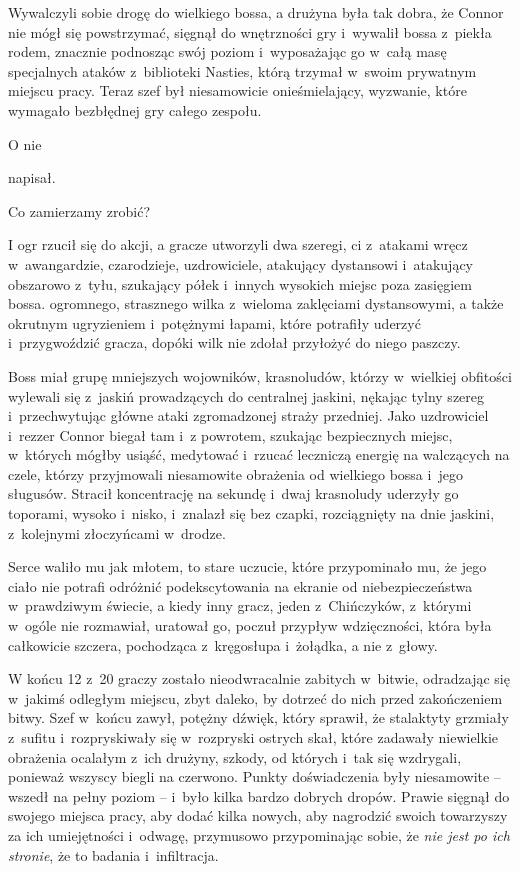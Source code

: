 \documentclass[oneside,polish,11pt,rmheadings]{mwbk}
\begin{document}
Wywalczyli sobie drogę do wielkiego bossa, a drużyna była tak dobra, że Connor nie mógł się powstrzymać, sięgnął do wnętrzności gry i~wywalił bossa z~piekła rodem, znacznie podnosząc swój poziom i~wyposażając go w~całą masę specjalnych ataków z~biblioteki Nasties, którą trzymał w~swoim prywatnym miejscu pracy. Teraz szef był niesamowicie onieśmielający, wyzwanie, które wymagało bezbłędnej gry całego zespołu.

\noindent {\textgreater} O nie

napisał.

\noindent {\textgreater} Co zamierzamy zrobić?

I ogr rzucił się do akcji, a gracze utworzyli dwa szeregi, ci z~atakami wręcz w~awangardzie, czarodzieje, uzdrowiciele, atakujący dystansowi i~atakujący obszarowo z~tyłu, szukający półek i~innych wysokich miejsc poza zasięgiem bossa. ogromnego, strasznego wilka z~wieloma zaklęciami dystansowymi, a także okrutnym ugryzieniem i~potężnymi łapami, które potrafiły uderzyć i~przygwoździć gracza, dopóki wilk nie zdołał przyłożyć do niego paszczy.

Boss miał grupę mniejszych wojowników, krasnoludów, którzy w~wielkiej obfitości wylewali się z~jaskiń prowadzących do centralnej jaskini, nękając tylny szereg i~przechwytując główne ataki zgromadzonej straży przedniej. Jako uzdrowiciel i~rezzer Connor biegał tam i~z powrotem, szukając bezpiecznych miejsc, w~których mógłby usiąść, medytować i~rzucać leczniczą energię na walczących na czele, którzy przyjmowali niesamowite obrażenia od wielkiego bossa i~jego sługusów. Stracił koncentrację na sekundę i~dwaj krasnoludy uderzyły go toporami, wysoko i~nisko, i~znalazł się bez czapki, rozciągnięty na dnie jaskini, z~kolejnymi złoczyńcami w~drodze.

Serce waliło mu jak młotem, to stare uczucie, które przypominało mu, że jego ciało nie potrafi odróżnić podekscytowania na ekranie od niebezpieczeństwa w~prawdziwym świecie, a kiedy inny gracz, jeden z~Chińczyków, z~którymi w~ogóle nie rozmawiał, uratował go, poczuł przypływ wdzięczności, która była całkowicie szczera, pochodząca z~kręgosłupa i~żołądka, a nie z~głowy.

W końcu 12 z~20 graczy zostało nieodwracalnie zabitych w~bitwie, odradzając się w~jakimś odległym miejscu, zbyt daleko, by dotrzeć do nich przed zakończeniem bitwy. Szef w~końcu zawył, potężny dźwięk, który sprawił, że stalaktyty grzmiały z~sufitu i~rozpryskiwały się w~rozpryski ostrych skał, które zadawały niewielkie obrażenia ocalałym z~ich drużyny, szkody, od których i~tak się wzdrygali, ponieważ wszyscy biegli na czerwono. Punkty doświadczenia były niesamowite -- wszedł na pełny poziom -- i~było kilka bardzo dobrych dropów. Prawie sięgnął do swojego miejsca pracy, aby dodać kilka nowych, aby nagrodzić swoich towarzyszy za ich umiejętności i~odwagę, przymusowo przypominając sobie, że \textit{nie jest po ich stronie}, że to badania i~infiltracja.
\end{document}
